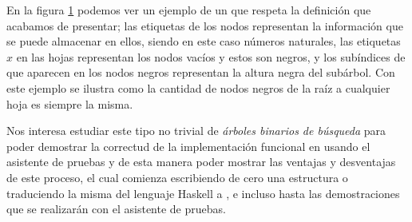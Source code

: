 \begin{figure}[!ht]
\centering
\captionsetup{justification=centering}
\caption {\Arn}
\label{arbolRB_1}
\end{figure}

En la figura \ref{arbolRB_1} podemos ver un ejemplo de un {\arn} que respeta la definici\'on que
acabamos de presentar; las etiquetas de los nodos representan la informaci\'on que se puede 
almacenar en ellos, siendo en este caso n\'umeros naturales, las etiquetas $x$ en las hojas 
representan los nodos vacíos y estos son negros, y los subíndices de que aparecen en los nodos 
negros representan la altura negra del sub\'arbol. Con este ejemplo se ilustra como la cantidad de 
nodos negros de la ra\'iz a cualquier hoja es siempre la misma.

Nos interesa estudiar este tipo no trivial de \textit{\'arboles binarios de búsqueda} para poder
demostrar la correctud de la implementaci\'on funcional en \cite{tesisG} usando el asistente de 
pruebas {\coq} y de esta manera poder mostrar las ventajas y desventajas de este proceso, el cual 
comienza escribiendo de cero una estructura o traduciendo la misma del lenguaje Haskell a {\coq}, e 
incluso hasta las demostraciones que se realizar\'an con el asistente de pruebas.

